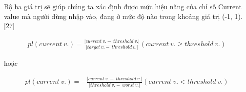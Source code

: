 Bộ ba giá trị sẽ giúp chúng ta xác định được mức hiệu năng của chỉ số Current value mà người dùng nhập vào, đang ở mức độ nào trong khoảng giá trị (-1, 1). [27]

\begin{align}
      pl(current{\ }v.) = \frac{\left| current{\ }v. -{\ }threshold{\ }v.\right|}{\left| target{\ }v. -{\ }threshold{\ }v. \right|} (current {\ }v.\geq  threshold{\ }v.)
\end{align}

hoặc

\begin{align}
      pl(current{\ }v.) = - \frac{\left| current{\ }v. -{\ }threshold{\ }v.\right|}{\left| threshold{\ }v. -{\ }worst{\ }v. \right|} (current {\ }v. <  threshold{\ }v.)
\end{align}